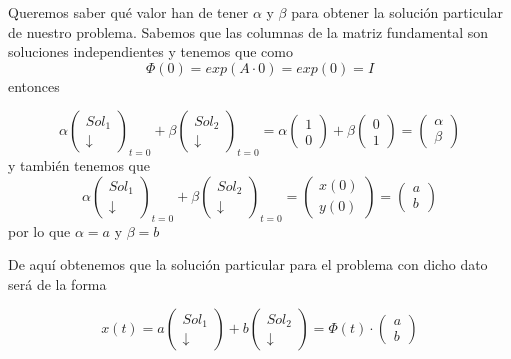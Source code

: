 \documentclass{mathnotes}
\begin{document}
\begin{example}[(Método II)]
Queremos saber qué valor han de tener $\alpha$ y $\beta$ para obtener la solución particular de nuestro problema. Sabemos que las columnas de la matriz fundamental son soluciones independientes y tenemos que como $$\Phi(0) = exp(A\cdot 0) = exp(0) = I$$ entonces

$$\alpha\begin{pmatrix}
Sol_1\\\downarrow
\end{pmatrix}_{t=0} + \beta\begin{pmatrix}
Sol_2\\\downarrow
\end{pmatrix}_{t=0} = \alpha\begin{pmatrix}
1\\0
\end{pmatrix}+\beta\begin{pmatrix}
0\\1
\end{pmatrix} = \begin{pmatrix}
\alpha\\\beta
\end{pmatrix}$$ y también tenemos que $$\alpha\begin{pmatrix}
Sol_1\\\downarrow
\end{pmatrix}_{t=0} + \beta\begin{pmatrix}
Sol_2\\\downarrow
\end{pmatrix}_{t=0} = \begin{pmatrix}
x(0)\\y(0)
\end{pmatrix} = \begin{pmatrix}
a\\b
\end{pmatrix}$$ por lo que $\alpha = a$ y $\beta = b$

De aquí obtenemos que la solución particular para el problema con dicho dato será de la forma

$$x(t) = a\begin{pmatrix}
Sol_1\\\downarrow
\end{pmatrix} + b\begin{pmatrix}
Sol_2\\\downarrow
\end{pmatrix} = \Phi(t) \cdot \begin{pmatrix}
a\\b
\end{pmatrix}$$
\end{example}
\end{document}
